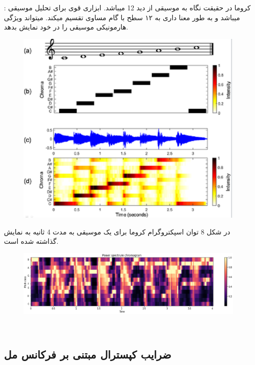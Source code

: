 \documentclass[10pt,onecolumn,a4paper]{article}
\begin{document}
  :  کروما در حقیقت نگاه به موسیقی از دید 12   میباشد. ابزاری قوی برای تحلیل موسیقی میباشد و به طور معنا داری به ۱۲ سطح با گام مساوی تقسیم میکند. میتواند ویژگی هارمونیکی موسیقی را در خود نمایش بدهد.\\

\begin{figure}[h!]
        \centering
        \includegraphics[scale=0.55]{6.png}
        \caption{  }  
    \end{figure}

در شکل 8 توان اسپکتروگرام کروما برای یک موسیقی به مدت 4 ثانیه به نمایش گذاشته شده است.\\
 \begin{figure}[h!]
        \centering
        \includegraphics[scale=0.5]{7.png}
        \caption{  }  
    \end{figure}
\\

\subsection{ضرایب کپسترال مبتنی بر فرکانس مل}
\end{document}
